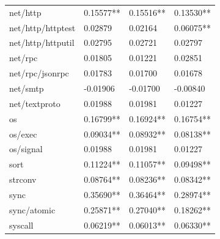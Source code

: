 \documentclass{seal_thesis}
\begin{document}
\begin{table}[H]
\begin{tabular}{@{}llll@{}}
		net/http & \cellcolor[HTML]{99CCFF}0.15577** & \cellcolor[HTML]{99CCFF}0.15516** & \cellcolor[HTML]{99CCFF}0.13530** \\
		net/http/httptest & \cellcolor[HTML]{3366FF}0.02879 & \cellcolor[HTML]{3366FF}0.02164 & \cellcolor[HTML]{3366FF}0.06075** \\
		net/http/httputil & \cellcolor[HTML]{3366FF}0.02795 & \cellcolor[HTML]{3366FF}0.02721 & \cellcolor[HTML]{3366FF}0.02797 \\
		net/rpc & \cellcolor[HTML]{333399}\color{white}0.01805 & \cellcolor[HTML]{333399}\color{white}0.01221 & \cellcolor[HTML]{3366FF}0.02851 \\
		net/rpc/jsonrpc & \cellcolor[HTML]{333399}\color{white}0.01783 & \cellcolor[HTML]{333399}\color{white}0.01700 & \cellcolor[HTML]{333399}\color{white}0.01678 \\
		net/smtp & \cellcolor[HTML]{333399}\color{white}-0.01906 & \cellcolor[HTML]{333399}\color{white}-0.01700 & \cellcolor[HTML]{333399}\color{white}-0.00840 \\
		net/textproto & \cellcolor[HTML]{3366FF}0.01988 & \cellcolor[HTML]{3366FF}0.01981 & \cellcolor[HTML]{333399}\color{white}0.01227 \\
		os & \cellcolor[HTML]{99CCFF}0.16799** & \cellcolor[HTML]{99CCFF}0.16924** & \cellcolor[HTML]{99CCFF}0.16754** \\
		os/exec & \cellcolor[HTML]{99CCFF}0.09034** & \cellcolor[HTML]{99CCFF}0.08932** & \cellcolor[HTML]{99CCFF}0.08138** \\
		os/signal & \cellcolor[HTML]{3366FF}0.01988 & \cellcolor[HTML]{3366FF}0.01981 & \cellcolor[HTML]{333399}\color{white}0.01227 \\
		sort & \cellcolor[HTML]{99CCFF}0.11224** & \cellcolor[HTML]{99CCFF}0.11057** & \cellcolor[HTML]{99CCFF}0.09498** \\
		strconv & \cellcolor[HTML]{99CCFF}0.08764** & \cellcolor[HTML]{99CCFF}0.08236** & \cellcolor[HTML]{99CCFF}0.08342** \\
		sync & \cellcolor[HTML]{FF8080}0.35690** & \cellcolor[HTML]{FF8080}0.36464** & \cellcolor[HTML]{FFCC99}0.28974** \\
		sync/atomic & \cellcolor[HTML]{FFCC99}0.25871** & \cellcolor[HTML]{FFCC99}0.27040** & \cellcolor[HTML]{99CCFF}0.18262** \\
		syscall & \cellcolor[HTML]{3366FF}0.06219** & \cellcolor[HTML]{3366FF}0.06013** & \cellcolor[HTML]{3366FF}0.06330** \\\bottomrule
	\end{tabular}
\end{table}
\end{document}
